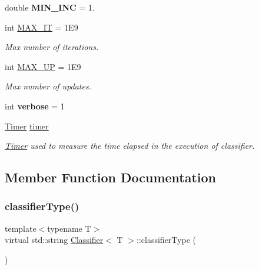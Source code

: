 \begin{DoxyCompactItemize}
\mbox{\label{class_classifier_af06ecff6cbcf9aee87de3fdcf6b71a1a}} 
double {\bfseries M\+I\+N\+\_\+\+I\+NC} = 1.
\item 
\mbox{\label{class_classifier_a3b7f1c31910fff58907bcfe2cfc6cf89}} 
int \mbox{\hyperlink{class_classifier_a3b7f1c31910fff58907bcfe2cfc6cf89}{M\+A\+X\+\_\+\+IT}} = 1\+E9
\begin{DoxyCompactList}\small\item\em Max number of iterations. \end{DoxyCompactList}\item 
\mbox{\label{class_classifier_a8d3289755d689efa65ca009d4c4ffa13}} 
int \mbox{\hyperlink{class_classifier_a8d3289755d689efa65ca009d4c4ffa13}{M\+A\+X\+\_\+\+UP}} = 1\+E9
\begin{DoxyCompactList}\small\item\em Max number of updates. \end{DoxyCompactList}\item 
\mbox{\label{class_classifier_ab76f30bc5403b4e7091cf810d3c96654}} 
int {\bfseries verbose} = 1
\item 
\mbox{\label{class_classifier_a7426be6798e9a184e6d968f91a361a93}} 
\mbox{\hyperlink{class_timer}{Timer}} \mbox{\hyperlink{class_classifier_a7426be6798e9a184e6d968f91a361a93}{timer}}
\begin{DoxyCompactList}\small\item\em \mbox{\hyperlink{class_timer}{Timer}} used to measure the time elapsed in the execution of classifier. \end{DoxyCompactList}\end{DoxyCompactItemize}


\subsection{Member Function Documentation}
\mbox{\label{class_classifier_ab40f42f957ec50939bd9a6b0cd5d1786}} 
\subsubsection{\texorpdfstring{classifier\+Type()}{classifierType()}}
{\footnotesize\ttfamily template$<$typename T$>$ \\
virtual std\+::string \mbox{\hyperlink{class_classifier}{Classifier}}$<$ T $>$\+::classifier\+Type (\begin{DoxyParamCaption}{ }\end{DoxyParamCaption})\hspace{0.3cm}{\ttfamily [pure virtual]}}



